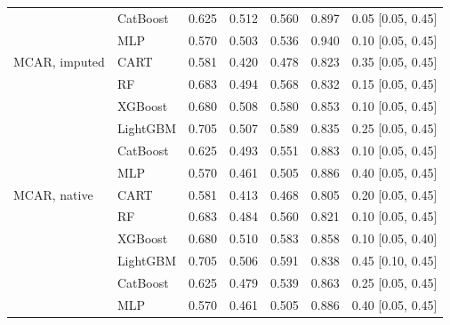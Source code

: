 \documentclass[pdflatex,sn-mathphys]{sn-jnl}
\theoremstyle{thmstyleone}
\begin{document}
\begin{table}[htbp]
\begin{tabular}{@{}llrrrrl@{}}
 & CatBoost & 0.625 & 0.512 & 0.560 & 0.897 & 0.05 [0.05, 0.45] \\
 & MLP & 0.570 & 0.503 & 0.536 & 0.940 & 0.10 [0.05, 0.45] \\
\midrule
MCAR, imputed & CART & 0.581 & 0.420 & 0.478 & 0.823 & 0.35 [0.05, 0.45] \\
 & RF & 0.683 & 0.494 & 0.568 & 0.832 & 0.15 [0.05, 0.45] \\
 & XGBoost & 0.680 & 0.508 & 0.580 & 0.853 & 0.10 [0.05, 0.45] \\
 & LightGBM & 0.705 & 0.507 & 0.589 & 0.835 & 0.25 [0.05, 0.45] \\
 & CatBoost & 0.625 & 0.493 & 0.551 & 0.883 & 0.10 [0.05, 0.45] \\
 & MLP & 0.570 & 0.461 & 0.505 & 0.886 & 0.40 [0.05, 0.45] \\
\midrule
MCAR, native & CART & 0.581 & 0.413 & 0.468 & 0.805 & 0.20 [0.05, 0.45] \\
 & RF & 0.683 & 0.484 & 0.560 & 0.821 & 0.10 [0.05, 0.45] \\
 & XGBoost & 0.680 & 0.510 & 0.583 & 0.858 & 0.10 [0.05, 0.40] \\
 & LightGBM & 0.705 & 0.506 & 0.591 & 0.838 & 0.45 [0.10, 0.45] \\
 & CatBoost & 0.625 & 0.479 & 0.539 & 0.863 & 0.25 [0.05, 0.45] \\
 & MLP & 0.570 & 0.461 & 0.505 & 0.886 & 0.40 [0.05, 0.45] \\
\bottomrule
\end{tabular}
\end{table}
\end{document}
